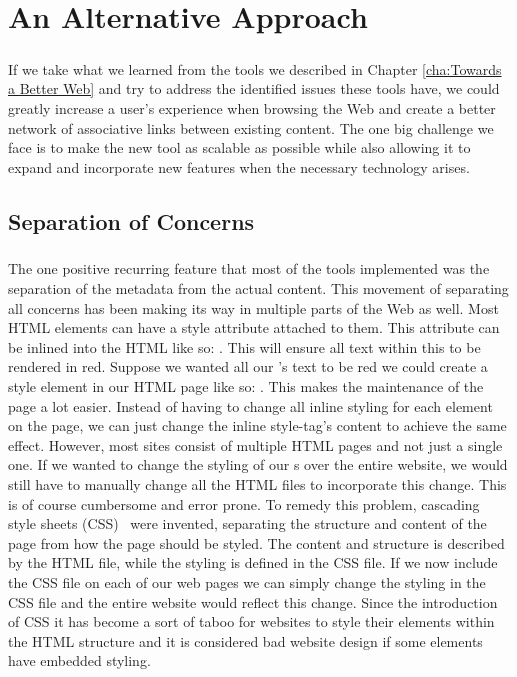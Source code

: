 
\chapter{An Alternative Approach} \label{cha:An Alternative Approach}
\paragraph{}
If we take what we learned from the tools we described in Chapter \ref{cha:Towards a Better Web} and try to address the identified issues these tools have, we could greatly increase a user's experience when browsing the Web and create a better network of associative links between existing content. The one big challenge we face is to make the new tool as scalable as possible while also allowing it to expand and incorporate new features when the necessary technology arises.

\section{Separation of Concerns} \label{sec:Separation Of Concerns}
	\paragraph{}
	The one positive recurring feature that most of the tools implemented was the separation of the metadata from the actual content. This movement of separating all concerns has been making its way in multiple parts of the Web as well. Most HTML elements can have a style attribute attached to them. This attribute can be inlined into the HTML like so: . This will ensure all text within this  to be rendered in red. Suppose we wanted all our 's text to be red we could create a style element in our HTML page like so: . This makes the maintenance of the page a lot easier. Instead of having to change all inline styling for each  element on the page, we can just change the inline style-tag's content to achieve the same effect. However, most sites consist of multiple HTML pages and not just a single one. If we wanted to change the styling of our s over the entire website, we would still have to manually change all the HTML files to incorporate this change. This is of course cumbersome and error prone. To remedy this problem, cascading style sheets (CSS)~\cite{Etemad2011} were invented, separating the structure and content of the page from how the page should be styled. The content and structure is described by the HTML file, while the styling is defined in the CSS file. If we now include the CSS file on each of our web pages we can simply change the styling in the CSS file and the entire website would reflect this change. Since the introduction of CSS it has become a sort of taboo for websites to style their elements within the HTML structure and it is considered bad website design if some elements have embedded styling.
